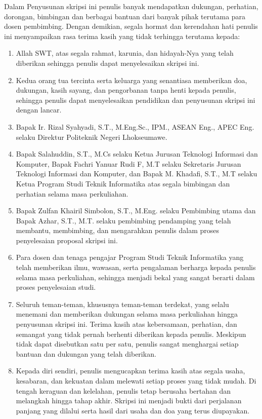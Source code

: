 Dalam Penyusunan skripsi ini penulis banyak mendapatkan dukungan, perhatian, dorongan, bimbingan dan berbagai bantuan dari banyak pihak terutama para dosen pembimbing. Dengan demikian, segala hormat dan kerendahan hati penulis ini menyampaikan rasa terima kasih yang tidak terhingga terutama kepada:
\begin{enumerate}
    \item Allah SWT, atas segala rahmat, karunia, dan hidayah-Nya yang telah diberikan sehingga penulis dapat menyelesaikan skripsi ini.
    \item Kedua orang tua tercinta serta keluarga yang senantiasa memberikan doa, dukungan, kasih sayang, dan pengorbanan tanpa henti kepada penulis, sehingga penulis dapat menyelesaikan pendidikan dan penyusunan skripsi ini dengan lancar.
    \item Bapak Ir. Rizal Syahyadi, S.T., M.Eng.Sc., IPM., ASEAN Eng., APEC Eng. selaku Direktur Politeknik Negeri Lhokseumawe.
    \item Bapak Salahuddin, S.T., M.Cs selaku Ketua Jurusan Teknologi Informasi dan Komputer, Bapak Fachri Yanuar Rudi F, M.T selaku Sekretaris Jurusan Teknologi Informasi dan Komputer, dan Bapak M. Khadafi, S.T., M.T selaku Ketua Program Studi Teknik Informatika atas segala bimbingan dan perhatian selama masa perkuliahan.
    \item Bapak Zulfan Khairil Simbolon, S.T., M.Eng. selaku Pembimbing utama dan Bapak Azhar, S.T., M.T. selaku pembimbing pendamping yang telah membantu, membimbing, dan mengarahkan penulis dalam proses penyelesaian proposal skripsi ini.
    \item Para dosen dan tenaga pengajar Program Studi Teknik Informatika yang telah memberikan ilmu, wawasan, serta pengalaman berharga kepada penulis selama masa perkuliahan, sehingga menjadi bekal yang sangat berarti dalam proses penyelesaian studi.
    \item Seluruh teman-teman, khususnya teman-teman terdekat, yang selalu menemani dan memberikan dukungan selama masa perkuliahan hingga penyusunan skripsi ini. Terima kasih atas kebersamaan, perhatian, dan semangat yang tidak pernah berhenti diberikan kepada penulis. Meskipun tidak dapat disebutkan satu per satu, penulis sangat menghargai setiap bantuan dan dukungan yang telah diberikan.
    \item Kepada diri sendiri, penulis mengucapkan terima kasih atas segala usaha, kesabaran, dan kekuatan dalam melewati setiap proses yang tidak mudah. Di tengah keraguan dan kelelahan, penulis tetap berusaha bertahan dan melangkah hingga tahap akhir. Skripsi ini menjadi bukti dari perjalanan panjang yang dilalui serta hasil dari usaha dan doa yang terus diupayakan.
\end{enumerate}

